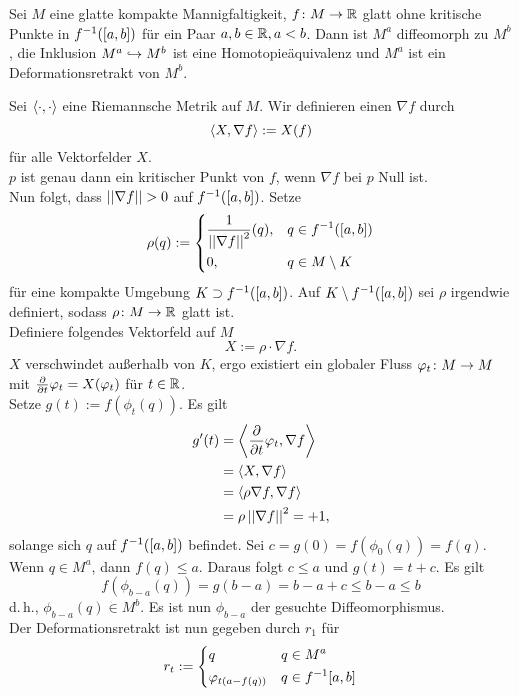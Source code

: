 \Prop{}
Sei $M$ eine glatte kompakte Mannigfaltigkeit, $f \colon M \overset{}{\rightarrow} \mathbb{R}$ glatt ohne kritische Punkte in $f^{-1}([a,b])$ für ein Paar $a,b \in \mathbb{R}, a < b$. Dann ist $M^a$ diffeomorph zu $M^b$, die Inklusion $M^a \overset{}{\hookrightarrow} M^b$ ist eine Homotopieäquivalenz und $M^a$ ist ein Deformationsretrakt von $M^b$.
\begin{Beweis}{}
Sei $\left<\cdot, \cdot\right>$ eine Riemannsche Metrik auf $M$.
\Def{}
Wir definieren einen  $\nabla f$ durch
\[ \left<X, \nabla f\right> := X(f) \]
für alle Vektorfelder $X$.\\

$p$ ist genau dann ein kritischer Punkt von $f$, wenn $\nabla f$ bei $p$ Null ist.\\
Nun folgt, dass $\left|\left|\nabla f\right|\right| > 0$ auf $f^{-1}([a,b])$. Setze
\[ \rho(q) :=
\left\lbrace
\begin{aligned}
&\frac{1}{\left|\left|\nabla f\right|\right|^2}(q),&& q \in f^{-1}([a,b])\\
&0, && q \in M \setminus K
\end{aligned}
\right.\]
für eine kompakte Umgebung $K \supset f^{-1}([a,b])$. Auf $K \setminus f^{-1}([a,b])$ sei $\rho$ irgendwie definiert, sodass $\rho \colon M \overset{}{\rightarrow} \mathbb{R}$ glatt ist.\\
Definiere folgendes Vektorfeld auf $M$
\[ X:= \rho \cdot \nabla f. \]
$X$ verschwindet außerhalb von $K$,
ergo existiert ein globaler Fluss $\varphi_t \colon M \overset{}{\rightarrow} M$ mit $\frac{\partial }{\partial t} \varphi_t = X(\varphi_t)$ für $ t \in \mathbb{R}$.\\
Setze $g(t) := f(\phi_t(q))$. Es gilt
\begin{align*}
g'(t) &= \left< \frac{\partial }{\partial t} \varphi_t , \nabla f \right>\\
&= \left< X , \nabla f \right>\\
&= \left< \rho \nabla f , \nabla f \right>\\
&= \rho \left|\left|\nabla f\right|\right|^2 = +1,\\
\end{align*}
solange sich $q$ auf $f^{-1}([a,b])$ befindet.
Sei $c = g(0) = f(\phi_0(q)) = f(q)$. Wenn $q \in M^a$, dann $f(q) \leq a$. Daraus folgt $c \leq a$ und $g(t) = t + c$. Es gilt
\[ f(\phi_{b-a}(q)) = g(b-a) = b-a + c \leq b -a \leq b \]
d.\,h., $\phi_{b-a} (q) \in M^b$. Es ist nun $\phi_{b-a}$ der gesuchte Diffeomorphismus.\\
Der Deformationsretrakt ist nun gegeben durch $r_1$ für 
\[ r_t := 
\left\lbrace
\begin{aligned}
&q && q \in M^a\\
&\varphi_{t(a- f(q))} && q \in f^{-1}[a,b]
\end{aligned}
\right.
 \]
\end{Beweis}